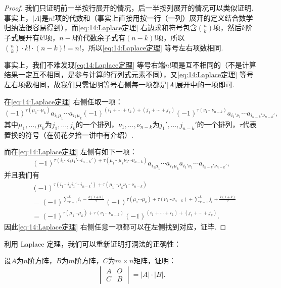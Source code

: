\begin{proof}
    我们只证明前一半按行展开的情况，后一半按列展开的情况可以类似证明. 事实上，$|A|$是$n!$项的代数和（事实上直接用按一行（一列）展开的定义结合数学归纳法很容易得到），而\autoref{eq:14:Laplace定理} 右边求和符号包含$\binom{n}{k}$项，然后$k$阶子式展开有$k!$项，$n-k$阶代数余子式有$(n-k)!$项，所以$\binom{n}{k}\cdot k!\cdot (n-k)!=n!$，所以\autoref{eq:14:Laplace定理} 等号左右项数相同.

    事实上，我们不难发现\autoref{eq:14:Laplace定理} 等号右端$n!$项是互不相同的（不是计算结果一定互不相同，是参与计算的行列式元素不同），又\autoref{eq:14:Laplace定理} 等号左右项数相同，故我们只需证明等号右侧每一项都是$|A|$展开中的一项即可.

    在\autoref{eq:14:Laplace定理} 右侧任取一项：
    \[(-1)^{\tau(\mu_1\cdots\mu_k)}a_{i_1\mu_1}\cdots a_{i_k\mu_k}(-1)^{(i_1+\cdots+i_k)+(j_1+\cdots+j_k)}(-1)^{\tau(\nu_1\cdots\nu_{n-k})}a_{i_1'\nu_1}\cdots a_{i_{n-k}'\nu_{n-k}'},\]
    其中$\mu_1,\ldots,\mu_k$为$j_1,\ldots,j_k$的一个排列，$\nu_1,\ldots,\nu_{n-k}$为$j_1',\ldots,j_{n-k}'$的一个排列，$\tau$代表置换的符号（在朝花夕拾一讲中有介绍）.

    而在\autoref{eq:14:Laplace定理} 左侧有如下一项：
    \[(-1)^{\tau(i_1\cdots i_ki_1'\cdots i_{n-k}')+\tau(\mu_1\cdots\mu_k\nu_1\cdots\nu_{n-k})}a_{i_1\mu_1}\cdots a_{i_k\mu_k}a_{i_1'\nu_1}\cdots a_{i_{n-k}'\nu_{n-k}'},\]
    并且我们有
    \begin{align*}
         & (-1)^{\tau(i_1\cdots i_ki_1'\cdots i_{n-k}')+\tau(\mu_1\cdots\mu_k\nu_1\cdots\nu_{n-k})}                                                        \\
         & =(-1)^{\sum\limits_{r=1}^ki_r-\frac{k(1+k)}{2}}(-1)^{\tau(\mu_1\cdots\mu_k)+\tau(\nu_1\cdots\nu_{n-k})+\sum\limits_{r=1}^kj_r+\frac{k(1+k)}{2}} \\
         & =(-1)^{\tau(\mu_1\cdots\mu_k)+\tau(\nu_1\cdots\nu_{n-k})}(-1)^{(i_1+\cdots+i_k)+(j_1+\cdots+j_k)}.
    \end{align*}
    因此\autoref{eq:14:Laplace定理} 右侧任意一项都可以在左侧找到对应，证毕.
\end{proof}

利用 Laplace 定理，我们可以重新证明打洞法的正确性：

\begin{example}{}{}
    设$A$为$n$阶方阵，$B$为$m$阶方阵，$C$为$m\times n$矩阵，证明：
    \[ \begin{vmatrix}
            A & O \\
            C & B
        \end{vmatrix}=|A|\cdot|B|. \]
\end{example}

